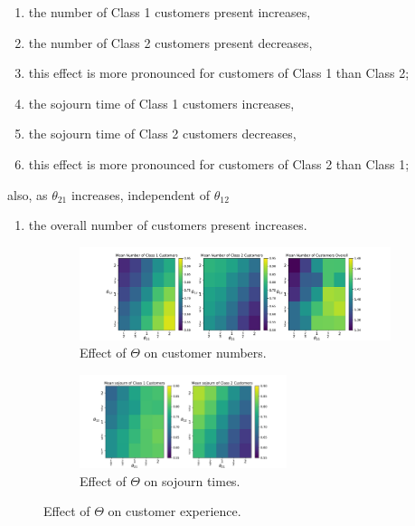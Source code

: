 \documentclass{article}
\begin{document}
{
\renewcommand{\theenumi}{E\arabic{enumi}}
\begin{enumerate}
  \item \label{enm:custs_1over2} the number of Class 1 customers present increases,
  \item \label{enm:custs_2over1} the number of Class 2 customers present decreases,
  \item \label{enm:custs_pronounced} this effect is more pronounced for customers of Class 1 than Class 2;
  \item \label{enm:sojourn_1over2} the sojourn time of Class 1 customers increases,
  \item \label{enm:sojourn_2over1} the sojourn time of Class 2 customers decreases,
  \item \label{enm:sojourn_pronounced} this effect is more pronounced for customers of Class 2 than Class 1;
\end{enumerate}

also, as $\theta_{21}$ increases, independent of $\theta_{12}$

\begin{enumerate}[resume]
  \item \label{enm:custs} the overall number of customers present increases.
\end{enumerate}
}

\begin{figure}
  \begin{subfigure}[b]{\textwidth}
    \begin{center}
    \includegraphics[width=\textwidth]{img/theta_effect_cust_numbers.pdf}
    \end{center}
    \caption{Effect of $\Theta$ on customer numbers.}
    \label{fig:theta_effect_custs}
  \end{subfigure}
  \begin{subfigure}[b]{\textwidth}
    \begin{center}
    \includegraphics[width=0.666\textwidth]{img/theta_effect_sojourn_times.pdf}
    \end{center}
    \caption{Effect of $\Theta$ on sojourn times.}
    \label{fig:theta_effect_sojourn}
  \end{subfigure}
  \caption{Effect of $\Theta$ on customer experience.}
  \label{fig:theta_effect}
\end{figure}
\end{document}
